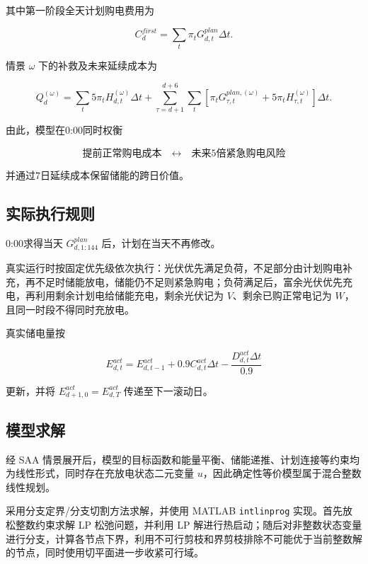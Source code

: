 其中第一阶段全天计划购电费用为

\begin{equation}
C_d^{first}
=
\sum_t
\pi_tG^{plan}_{d,t}\Delta t.
\end{equation}

情景 \(\omega\) 下的补救及未来延续成本为

\begin{equation}
Q_d^{(\omega)}
=
\sum_t5\pi_tH_{d,t}^{(\omega)}\Delta t
+
\sum_{\tau=d+1}^{d+6}\sum_t
\left[
\pi_tG_{\tau,t}^{plan,(\omega)}
+
5\pi_tH_{\tau,t}^{(\omega)}
\right]\Delta t.
\end{equation}

由此，模型在0:00同时权衡

\[
\boxed{
\text{提前正常购电成本}
\quad\longleftrightarrow\quad
\text{未来5倍紧急购电风险}
}
\]

并通过7日延续成本保留储能的跨日价值。

\subsection{实际执行规则}

0:00求得当天 \(G^{plan}_{d,1:144}\) 后，计划在当天不再修改。

真实运行时按固定优先级依次执行：光伏优先满足负荷，不足部分由计划购电补充，再不足时储能放电，储能仍不足则紧急购电；负荷满足后，富余光伏优先充电，再利用剩余计划电给储能充电，剩余光伏记为 \(V\)、剩余已购正常电记为 \(W\)，且同一时段不得同时充放电。

真实储电量按

\begin{equation}
E^{act}_{d,t}
=
E^{act}_{d,t-1}
+
0.9C^{act}_{d,t}\Delta t
-
\frac{D^{act}_{d,t}\Delta t}{0.9}
\end{equation}

更新，并将 \(E^{act}_{d+1,0}
=
E^{act}_{d,T}\) 传递至下一滚动日。

\subsection{模型求解}

经 SAA 情景展开后，模型的目标函数和能量平衡、储能递推、计划连接等约束均为线性形式，同时存在充放电状态二元变量 \(u\)，因此确定性等价模型属于混合整数线性规划。

采用分支定界/分支切割方法求解，并使用 MATLAB \texttt{intlinprog} 实现。首先放松整数约束求解 LP 松弛问题，并利用 LP 解进行热启动；随后对非整数状态变量进行分支，计算各节点下界，利用不可行剪枝和界剪枝排除不可能优于当前整数解的节点，同时使用切平面进一步收紧可行域。

